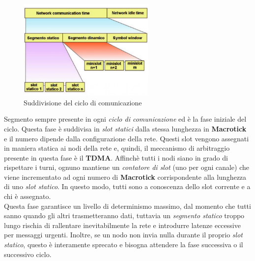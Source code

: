 \begin{figure}[h]
    \centering
    \includegraphics[width=0.6\textwidth]{capitoli/figure-protocolli/flexray-communication-cycle.jpg}
    \caption{Suddivisione del ciclo di comunicazione}
    \label{fig:communication-cycle-segments}
\end{figure}
Segmento sempre presente in ogni \emph{ciclo di comunicazione} ed è la fase iniziale del ciclo. Questa fase è suddivisa in \emph{slot statici} dalla stessa lunghezza in \textbf{Macrotick} e il numero dipende dalla configurazione della rete. Questi slot vengono assegnati in maniera statica ai nodi della rete e, quindi, il meccanismo di arbitraggio presente in questa fase è il \textbf{TDMA}. Affinchè tutti i nodi siano in grado di rispettare i turni, ognuno mantiene un \emph{contatore di slot} (uno per ogni canale) che viene incrementato ad ogni numero di \textbf{Macrotick} corrispondente alla lunghezza di uno \emph{slot statico}. In questo modo, tutti sono a conoscenza dello slot corrente e a chi è assegnato. \cite{flexray_specification}\\
Questa fase garantisce un livello di determinismo massimo, dal momento che tutti sanno quando gli altri trasmetteranno dati, tuttavia un \emph{segmento statico} troppo lungo rischia di rallentare inevitabilmente la rete e introdurre latenze eccessive per messaggi urgenti. Inoltre, se un nodo non invia nulla durante il proprio \emph{slot statico}, questo è interamente sprecato e bisogna attendere la fase successiva o il successivo ciclo. \cite{ni_flexray}


